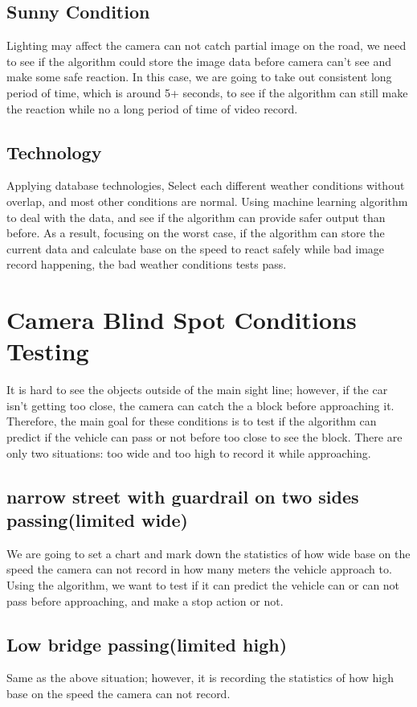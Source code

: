 \documentclass[10pt,draftclsnofoot,onecolumn,journal,compsoc]{IEEEtran}
\begin{document}
\subsection{Sunny Condition}
Lighting may affect the camera can not catch partial image on the road, we need to see if the algorithm could store the image data before camera can't see and make some safe reaction. In this case, we are going to take out consistent long period of time, which is around 5+ seconds, to see if the algorithm can still make the reaction while no a long period of time of video record.

\subsection{Technology}
Applying database technologies, Select each different weather conditions without overlap, and most other conditions are normal. Using machine learning algorithm to deal with the data, and see if the algorithm can provide safer output than before. As a result, focusing on the worst case, if the algorithm can store the current data and calculate base on the speed to react safely while bad image record happening, the bad weather conditions tests pass.


\section{Camera Blind Spot Conditions Testing}
It is hard to see the objects outside of the main sight line; however, if the car isn't getting too close, the camera can catch the a block before approaching it. Therefore, the main goal for these conditions is to test if the algorithm can predict if the vehicle can pass or not before too close to see the block. There are only two situations: too wide and too high to record it while approaching.

\subsection{narrow street with guardrail on two sides passing(limited wide)}
We are going to set a chart and mark down the statistics of how wide base on the speed the camera can not record in how many meters the vehicle approach to. Using the algorithm, we want to test if it can predict the vehicle can or can not pass before approaching, and make a stop action or not.

\subsection{Low bridge passing(limited high)}
Same as the above situation; however, it is recording the statistics of how high base on the speed the camera can not record. 
\end{document}
